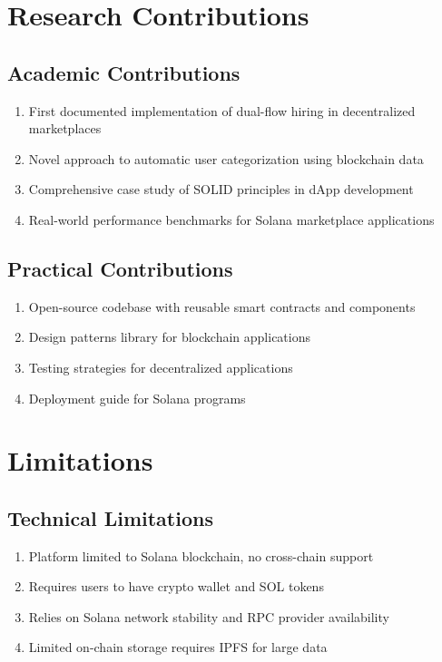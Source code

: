 \documentclass[a4paper,13pt,twoside]{report}
\theoremstyle{definition}
\begin{document}
\section{Research Contributions}

\subsection{Academic Contributions}

\begin{enumerate}
    \item First documented implementation of dual-flow hiring in decentralized marketplaces
    \item Novel approach to automatic user categorization using blockchain data
    \item Comprehensive case study of SOLID principles in dApp development
    \item Real-world performance benchmarks for Solana marketplace applications
\end{enumerate}

\subsection{Practical Contributions}

\begin{enumerate}
    \item Open-source codebase with reusable smart contracts and components
    \item Design patterns library for blockchain applications
    \item Testing strategies for decentralized applications
    \item Deployment guide for Solana programs
\end{enumerate}

\section{Limitations}

\subsection{Technical Limitations}

\begin{enumerate}
    \item Platform limited to Solana blockchain, no cross-chain support
    \item Requires users to have crypto wallet and SOL tokens
    \item Relies on Solana network stability and RPC provider availability
    \item Limited on-chain storage requires IPFS for large data
\end{enumerate}
\end{document}
